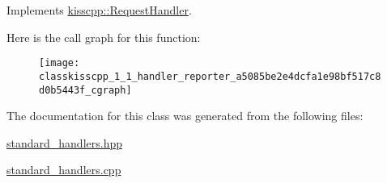 Implements \hyperlink{classkisscpp_1_1_request_handler_a3606f772c07297826847a8e36226cdaa}{kisscpp\-::\-Request\-Handler}.



Here is the call graph for this function\-:
\nopagebreak
\begin{figure}[H]
\begin{center}
\leavevmode
\texttt{[image: classkisscpp\_1\_1\_handler\_reporter\_a5085be2e4dcfa1e98bf517c8d0b5443f\_cgraph]}
\end{center}
\end{figure}




The documentation for this class was generated from the following files\-:\begin{DoxyCompactItemize}
\item 
\hyperlink{standard__handlers_8hpp}{standard\-\_\-handlers.\-hpp}\item 
\hyperlink{standard__handlers_8cpp}{standard\-\_\-handlers.\-cpp}\end{DoxyCompactItemize}
